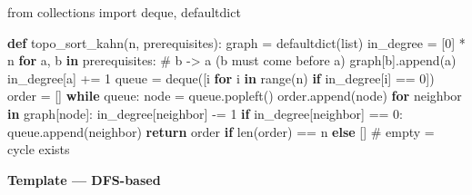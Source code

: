 \documentclass[11pt]{article}
\newenvironment{Shaded}{\begin{snugshade}}{\end{snugshade}}
\newcommand{\BuiltInTok}[1]{\textcolor[rgb]{0.50,0.55,0.55}{#1}}
\newcommand{\CommentTok}[1]{\textcolor[rgb]{0.48,0.49,0.49}{#1}}
\newcommand{\ControlFlowTok}[1]{\textcolor[rgb]{0.99,0.74,0.29}{\textbf{#1}}}
\newcommand{\DecValTok}[1]{\textcolor[rgb]{0.96,0.45,0.00}{#1}}
\newcommand{\ImportTok}[1]{\textcolor[rgb]{0.15,0.68,0.38}{#1}}
\newcommand{\KeywordTok}[1]{\textcolor[rgb]{0.81,0.81,0.76}{\textbf{#1}}}
\newcommand{\NormalTok}[1]{\textcolor[rgb]{0.81,0.81,0.76}{#1}}
\newcommand{\OperatorTok}[1]{\textcolor[rgb]{0.81,0.81,0.76}{#1}}
\begin{document}
\begin{Shaded}
\begin{Highlighting}[]
\ImportTok{from}\NormalTok{ collections }\ImportTok{import}\NormalTok{ deque, defaultdict}

\KeywordTok{def}\NormalTok{ topo\_sort\_kahn(n, prerequisites):}
\NormalTok{    graph }\OperatorTok{=}\NormalTok{ defaultdict(}\BuiltInTok{list}\NormalTok{)}
\NormalTok{    in\_degree }\OperatorTok{=}\NormalTok{ [}\DecValTok{0}\NormalTok{] }\OperatorTok{*}\NormalTok{ n}
    \ControlFlowTok{for}\NormalTok{ a, b }\KeywordTok{in}\NormalTok{ prerequisites:          }\CommentTok{\# b {-}\textgreater{} a (b must come before a)}
\NormalTok{        graph[b].append(a)}
\NormalTok{        in\_degree[a] }\OperatorTok{+=} \DecValTok{1}
\NormalTok{    queue }\OperatorTok{=}\NormalTok{ deque([i }\ControlFlowTok{for}\NormalTok{ i }\KeywordTok{in} \BuiltInTok{range}\NormalTok{(n) }\ControlFlowTok{if}\NormalTok{ in\_degree[i] }\OperatorTok{==} \DecValTok{0}\NormalTok{])}
\NormalTok{    order }\OperatorTok{=}\NormalTok{ []}
    \ControlFlowTok{while}\NormalTok{ queue:}
\NormalTok{        node }\OperatorTok{=}\NormalTok{ queue.popleft()}
\NormalTok{        order.append(node)}
        \ControlFlowTok{for}\NormalTok{ neighbor }\KeywordTok{in}\NormalTok{ graph[node]:}
\NormalTok{            in\_degree[neighbor] }\OperatorTok{{-}=} \DecValTok{1}
            \ControlFlowTok{if}\NormalTok{ in\_degree[neighbor] }\OperatorTok{==} \DecValTok{0}\NormalTok{:}
\NormalTok{                queue.append(neighbor)}
    \ControlFlowTok{return}\NormalTok{ order }\ControlFlowTok{if} \BuiltInTok{len}\NormalTok{(order) }\OperatorTok{==}\NormalTok{ n }\ControlFlowTok{else}\NormalTok{ []  }\CommentTok{\# empty = cycle exists}
\end{Highlighting}
\end{Shaded}

\textbf{Template --- DFS-based}

\end{document}
